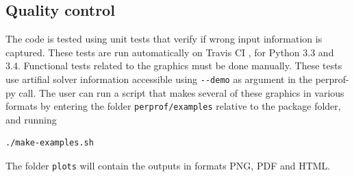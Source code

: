 \subsection*{Quality control}

    The code is tested using unit tests that verify if wrong input information
    is captured. These tests are run automatically on Travis CI
    \cite{url:travis}, for Python 3.3 and 3.4.
    Functional tests related to the graphics must be done manually.
    These tests use artifial solver information accessible using \verb+--demo+
    as argument in the perprof-py call. The user can run a script that makes
    several of these graphics in various formats by entering the folder
    \verb+perprof/examples+ relative to the package folder, and running
\begin{verbatim}
./make-examples.sh
\end{verbatim}
    The folder \verb+plots+ will contain the outputs in formats PNG, PDF and HTML.
